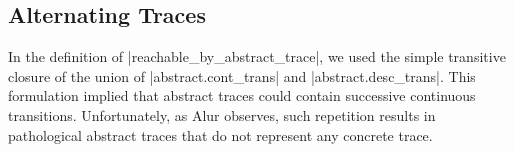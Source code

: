 \documentclass[runningheads]{llncs}
\begin{document}
% 
% 

\subsection{Alternating Traces}
\label{alter}

In the definition of |reachable_by_abstract_trace|, we used the simple transitive closure of the union of |abstract.cont_trans| and |abstract.desc_trans|. This formulation implied that abstract traces could contain successive continuous transitions. Unfortunately, as Alur observes, such repetition results in pathological abstract traces that do not represent any concrete trace. 
\end{document}
